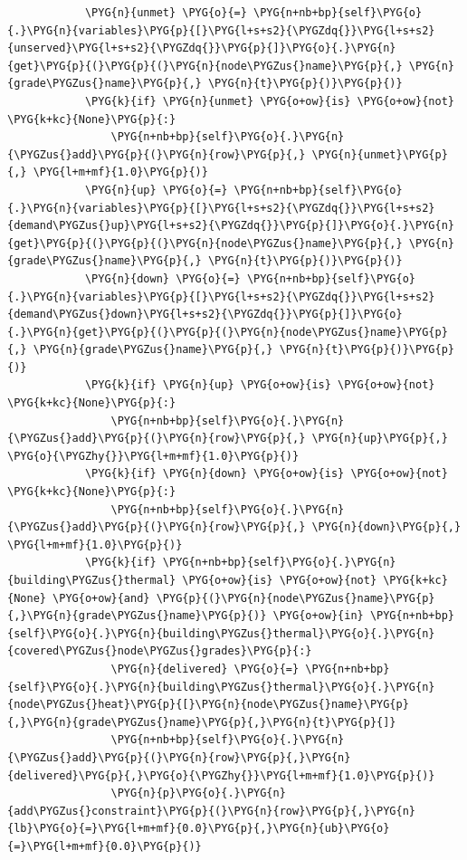 \begin{Verbatim}
            \PYG{n}{unmet} \PYG{o}{=} \PYG{n+nb+bp}{self}\PYG{o}{.}\PYG{n}{variables}\PYG{p}{[}\PYG{l+s+s2}{\PYGZdq{}}\PYG{l+s+s2}{unserved}\PYG{l+s+s2}{\PYGZdq{}}\PYG{p}{]}\PYG{o}{.}\PYG{n}{get}\PYG{p}{(}\PYG{p}{(}\PYG{n}{node\PYGZus{}name}\PYG{p}{,} \PYG{n}{grade\PYGZus{}name}\PYG{p}{,} \PYG{n}{t}\PYG{p}{)}\PYG{p}{)}
            \PYG{k}{if} \PYG{n}{unmet} \PYG{o+ow}{is} \PYG{o+ow}{not} \PYG{k+kc}{None}\PYG{p}{:}
                \PYG{n+nb+bp}{self}\PYG{o}{.}\PYG{n}{\PYGZus{}add}\PYG{p}{(}\PYG{n}{row}\PYG{p}{,} \PYG{n}{unmet}\PYG{p}{,} \PYG{l+m+mf}{1.0}\PYG{p}{)}
            \PYG{n}{up} \PYG{o}{=} \PYG{n+nb+bp}{self}\PYG{o}{.}\PYG{n}{variables}\PYG{p}{[}\PYG{l+s+s2}{\PYGZdq{}}\PYG{l+s+s2}{demand\PYGZus{}up}\PYG{l+s+s2}{\PYGZdq{}}\PYG{p}{]}\PYG{o}{.}\PYG{n}{get}\PYG{p}{(}\PYG{p}{(}\PYG{n}{node\PYGZus{}name}\PYG{p}{,} \PYG{n}{grade\PYGZus{}name}\PYG{p}{,} \PYG{n}{t}\PYG{p}{)}\PYG{p}{)}
            \PYG{n}{down} \PYG{o}{=} \PYG{n+nb+bp}{self}\PYG{o}{.}\PYG{n}{variables}\PYG{p}{[}\PYG{l+s+s2}{\PYGZdq{}}\PYG{l+s+s2}{demand\PYGZus{}down}\PYG{l+s+s2}{\PYGZdq{}}\PYG{p}{]}\PYG{o}{.}\PYG{n}{get}\PYG{p}{(}\PYG{p}{(}\PYG{n}{node\PYGZus{}name}\PYG{p}{,} \PYG{n}{grade\PYGZus{}name}\PYG{p}{,} \PYG{n}{t}\PYG{p}{)}\PYG{p}{)}
            \PYG{k}{if} \PYG{n}{up} \PYG{o+ow}{is} \PYG{o+ow}{not} \PYG{k+kc}{None}\PYG{p}{:}
                \PYG{n+nb+bp}{self}\PYG{o}{.}\PYG{n}{\PYGZus{}add}\PYG{p}{(}\PYG{n}{row}\PYG{p}{,} \PYG{n}{up}\PYG{p}{,} \PYG{o}{\PYGZhy{}}\PYG{l+m+mf}{1.0}\PYG{p}{)}
            \PYG{k}{if} \PYG{n}{down} \PYG{o+ow}{is} \PYG{o+ow}{not} \PYG{k+kc}{None}\PYG{p}{:}
                \PYG{n+nb+bp}{self}\PYG{o}{.}\PYG{n}{\PYGZus{}add}\PYG{p}{(}\PYG{n}{row}\PYG{p}{,} \PYG{n}{down}\PYG{p}{,} \PYG{l+m+mf}{1.0}\PYG{p}{)}
            \PYG{k}{if} \PYG{n+nb+bp}{self}\PYG{o}{.}\PYG{n}{building\PYGZus{}thermal} \PYG{o+ow}{is} \PYG{o+ow}{not} \PYG{k+kc}{None} \PYG{o+ow}{and} \PYG{p}{(}\PYG{n}{node\PYGZus{}name}\PYG{p}{,}\PYG{n}{grade\PYGZus{}name}\PYG{p}{)} \PYG{o+ow}{in} \PYG{n+nb+bp}{self}\PYG{o}{.}\PYG{n}{building\PYGZus{}thermal}\PYG{o}{.}\PYG{n}{covered\PYGZus{}node\PYGZus{}grades}\PYG{p}{:}
                \PYG{n}{delivered} \PYG{o}{=} \PYG{n+nb+bp}{self}\PYG{o}{.}\PYG{n}{building\PYGZus{}thermal}\PYG{o}{.}\PYG{n}{node\PYGZus{}heat}\PYG{p}{[}\PYG{n}{node\PYGZus{}name}\PYG{p}{,}\PYG{n}{grade\PYGZus{}name}\PYG{p}{,}\PYG{n}{t}\PYG{p}{]}
                \PYG{n+nb+bp}{self}\PYG{o}{.}\PYG{n}{\PYGZus{}add}\PYG{p}{(}\PYG{n}{row}\PYG{p}{,}\PYG{n}{delivered}\PYG{p}{,}\PYG{o}{\PYGZhy{}}\PYG{l+m+mf}{1.0}\PYG{p}{)}
                \PYG{n}{p}\PYG{o}{.}\PYG{n}{add\PYGZus{}constraint}\PYG{p}{(}\PYG{n}{row}\PYG{p}{,}\PYG{n}{lb}\PYG{o}{=}\PYG{l+m+mf}{0.0}\PYG{p}{,}\PYG{n}{ub}\PYG{o}{=}\PYG{l+m+mf}{0.0}\PYG{p}{)}

\end{Verbatim}
